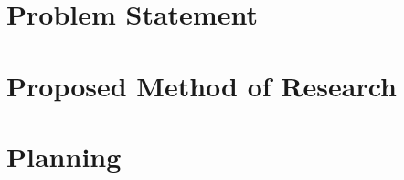 \documentclass[11pt]{article}
\begin{document}
\section{Problem Statement}


\cite{Arnold2013EI}


\section{Proposed Method of Research}

\section{Planning}
\end{document}
